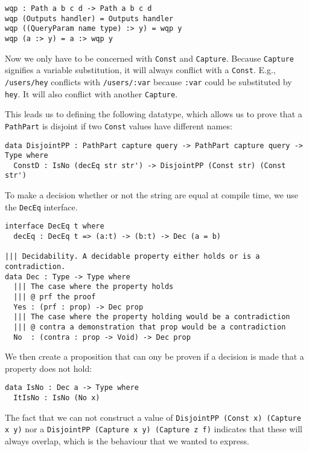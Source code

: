 \documentclass[12pt,a4paper]{article}
\begin{document}
\begin{verbatim}
wqp : Path a b c d -> Path a b c d
wqp (Outputs handler) = Outputs handler
wqp ((QueryParam name type) :> y) = wqp y
wqp (a :> y) = a :> wqp y
\end{verbatim}

Now we only have to be concerned with \texttt{Const} and \texttt{Capture}. Because \texttt{Capture} signifies a variable substitution, it will always conflict with a \texttt{Const}. E.g.,  \texttt{/users/hey} conflicts with \texttt{/users/:var} because \texttt{:var} could be substituted by \texttt{hey}. It will also conflict with another \texttt{Capture}.

This leads us to defining the following datatype, which allows us to prove that a \texttt{PathPart} is disjoint if  two \texttt{Const} values have different names:
\begin{verbatim}
data DisjointPP : PathPart capture query -> PathPart capture query -> Type where
  ConstD : IsNo (decEq str str') -> DisjointPP (Const str) (Const str')

\end{verbatim}

To make a decision whether or not the string are equal at compile time, we use the \texttt{DecEq} interface.
\begin{verbatim}
interface DecEq t where
  decEq : DecEq t => (a:t) -> (b:t) -> Dec (a = b)

||| Decidability. A decidable property either holds or is a contradiction.
data Dec : Type -> Type where
  ||| The case where the property holds
  ||| @ prf the proof
  Yes : (prf : prop) -> Dec prop
  ||| The case where the property holding would be a contradiction
  ||| @ contra a demonstration that prop would be a contradiction
  No  : (contra : prop -> Void) -> Dec prop
\end{verbatim}
We then create a proposition that can ony be proven if  a decision is made that a property does not hold:
\begin{verbatim}
data IsNo : Dec a -> Type where
  ItIsNo : IsNo (No x)
\end{verbatim}


The fact that we can not construct a value of \texttt{DisjointPP (Const x) (Capture x y)} nor a \texttt{DisjointPP (Capture x y) (Capture z f)} indicates that these will always overlap, which is the behaviour that we wanted to express.
\end{document}
